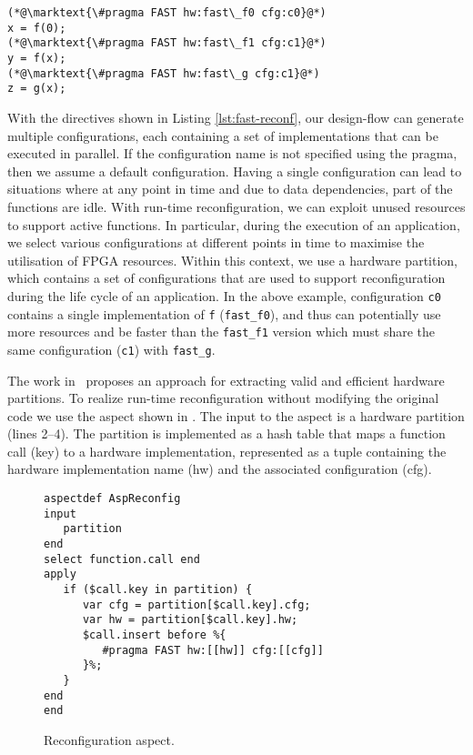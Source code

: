 \begin{lstlisting}[label=lst:fast-reconf,caption=FAST support for run-time reconfiguration.]
(*@\marktext{\#pragma FAST hw:fast\_f0 cfg:c0}@*)
x = f(0);
(*@\marktext{\#pragma FAST hw:fast\_f1 cfg:c1}@*)
y = f(x);
(*@\marktext{\#pragma FAST hw:fast\_g cfg:c1}@*)
z = g(x);
\end{lstlisting}


With the directives shown in Listing \ref{lst:fast-reconf}, our
design-flow can generate multiple configurations, each containing a
set of \FAST{} implementations that can be executed in parallel. If
the configuration name is not specified using the \FAST{} pragma, then
we assume a default configuration. Having a single configuration can
lead to situations where at any point in time and due to data
dependencies, part of the functions are idle. With run-time
reconfiguration, we can exploit unused resources to support active
functions. In particular, during the execution of an application, we
select various configurations at different points in time to maximise
the utilisation of FPGA resources. Within this context, we use a
hardware partition, which contains a set of configurations that are
used to support reconfiguration during the life cycle of an
application. In the above example, configuration \texttt{c0} contains
a single implementation of \texttt{f} (\texttt{fast\_f0}), and thus
can potentially use more resources and be faster than the
\texttt{fast\_f1} version which must share the same configuration
(\texttt{c1}) with \texttt{fast\_g}.

The work in~\cite{Xinyu:Qiwei:Luk:Qiang:Pell:2012} proposes an
approach for extracting valid and efficient hardware partitions. To realize
run-time reconfiguration without modifying the original code we use the
aspect shown in .  The input to the
aspect is a hardware partition (lines 2--4). The partition is implemented as a
hash table that maps a function call (key) to a hardware
implementation, represented as a tuple containing the hardware
implementation name (hw) and the associated configuration (cfg).

\lstset{style=lara}
\begin{figure}[!h]
\begin{lstlisting}
aspectdef AspReconfig
input
   partition
end
select function.call end
apply
   if ($call.key in partition) {
      var cfg = partition[$call.key].cfg;
      var hw = partition[$call.key].hw;
      $call.insert before %{
         #pragma FAST hw:[[hw]] cfg:[[cfg]]
      }%;
   }
end
end
\end{lstlisting}
\caption{Reconfiguration aspect.}
\label{fig:aspect-reconf}
\end{figure}

